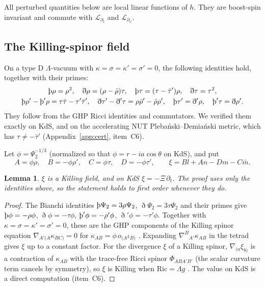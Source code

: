 \documentclass[11pt]{amsart}
\newtheorem{lemma}[theorem]{Lemma}
\theoremstyle{definition}
\theoremstyle{remark}
\numberwithin{equation}{section}
\newcommand{\Th}{\text{\th}}
\newcommand{\cL}{\mathcal{L}}
\begin{document}
All perturbed quantities below are local linear functions of $h$. They are boost-spin invariant and commute with
$\cL_{\partial_t}$ and $\cL_{\partial_\varphi}$.

\subsection{The Killing-spinor field}
On a type D $\Lambda$-vacuum with $\kappa=\sigma=\kappa'=\sigma'=0$, the following identities hold, together with
their primes:
\begin{gather*}
\Th\rho=\rho^2,\quad\eth\rho=(\rho-\bar\rho)\tau,\quad\Th\tau=(\tau-\bar\tau')\rho,\quad\eth\tau=\tau^2,\\
\Th\rho'-\Th'\rho=\tau\bar\tau-\tau'\bar\tau',\quad\eth\tau'-\eth'\tau=\rho\bar\rho'-\bar\rho\rho',\quad
\Th\tau'=\eth'\rho,\quad\Th'\tau=\eth\rho'.
\end{gather*}
They follow from the GHP Ricci identities and commutators. We verified them exactly on KdS, and on the accelerating NUT
Pleba\'nski--Demia\'nski metric, which has $\tau\ne-\bar\tau'$ (Appendix~\ref{app:cert}, item~C6).

Let $\phi=\Psi_2^{-1/3}$ (normalized so that $\phi=r-ia\cos\theta$ on KdS), and put
\[
A=\phi\rho,\quad B=-\phi\rho',\quad C=\phi\tau,\quad D=-\phi\tau',\qquad \xi=Bl+An-Dm-C\bar m.
\]

\begin{lemma}\label{lem:xi}
$\xi$ is a Killing field, and on KdS $\xi=-\Xi\,\partial_t$. The proof uses only the identities above, so the
statement holds to first order whenever they do.
\end{lemma}
\begin{proof}
The Bianchi identities $\Th\Psi_2=3\rho\Psi_2$, $\eth\Psi_2=3\tau\Psi_2$ and their primes give $\Th\phi=-\rho\phi$,
$\eth\phi=-\tau\phi$, $\Th'\phi=-\rho'\phi$, $\eth'\phi=-\tau'\phi$. Together with $\kappa=\sigma=\kappa'=\sigma'=0$, these are
the GHP components of the Killing spinor equation $\nabla_{A'(A}\kappa_{BC)}=0$ for $\kappa_{AB}=\phi\,o_{(A}\iota_{B)}$
\cite{AA13}. Expanding $\nabla^B{}_{A'}\kappa_{AB}$ in the tetrad gives $\xi$ up to a constant factor. For the divergence $\xi$ of a
Killing spinor, $\nabla_{(a}\xi_{b)}$ is a contraction of $\kappa_{AB}$ with the trace-free Ricci spinor
$\Phi_{ABA'B'}$ (the scalar curvature term cancels by symmetry), so $\xi$ is Killing when $\mathrm{Ric}=\Lambda g$
\cite{HS73,AA13}. The value on KdS is a direct computation (item~C6).
\end{proof}
\end{document}
